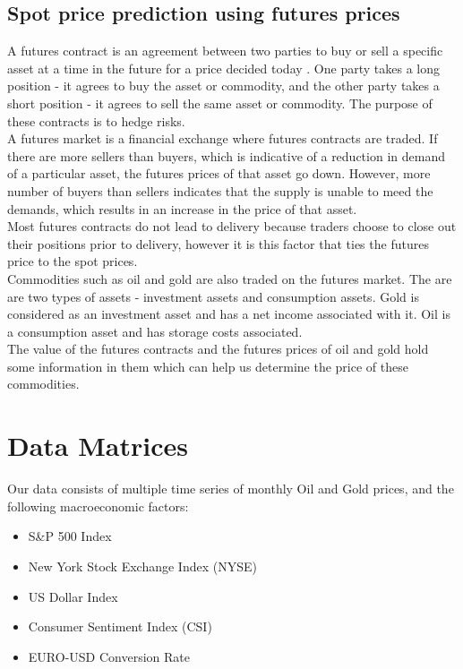 \documentclass[runningheads]{llncs}
\begin{document}
\subsection{Spot price prediction using futures prices}

A futures contract is an agreement between two parties to buy or sell a specific asset at a time in the future for a price decided today \cite{futures_book}. One party takes a long position - it agrees to buy the asset or commodity, and the other party takes a short position - it agrees to sell the same asset or commodity. The purpose of these contracts is to hedge risks.\\

\noindent A futures market is a financial exchange where futures contracts are traded. If there are more sellers than buyers, which is indicative of a reduction in demand of a particular asset, the futures prices of that asset go down. However, more number of buyers than sellers indicates that the supply is unable to meed the demands, which results in an increase in the price of that asset. \\

\noindent Most futures contracts do not lead to delivery because traders choose to close out their positions prior to delivery, however it is this factor that ties the futures price to the spot prices. \\

\noindent Commodities such as oil and gold are also traded on the futures market. The are are two types of assets - investment assets and consumption assets. Gold is considered as an investment asset and has a net income associated with it. Oil is a consumption asset and has storage costs associated.\\

\noindent The value of the futures contracts and the futures prices of oil and gold hold some information in them which can help us determine the price of these commodities.  

\newpage
\section{Data Matrices}
Our data consists of multiple time series of monthly Oil and Gold prices\cite{quandal}, and the following macroeconomic factors:

\begin {itemize}
\item S\&P 500 Index \cite{quandal}
\item New York Stock Exchange Index (NYSE) \cite{quandal}
\item US Dollar Index \cite{quandal}
\item Consumer Sentiment Index (CSI) \cite{csi}
\item EURO-USD Conversion Rate \cite{quandal}
\end {itemize}
 
\end{document}
